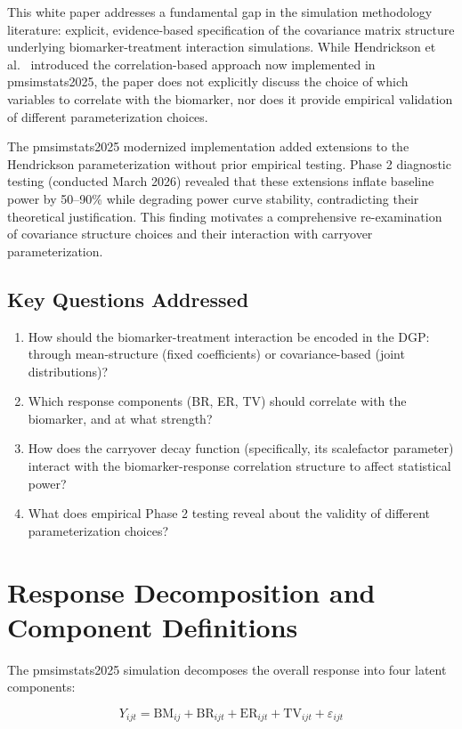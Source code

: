 \documentclass[12pt,a4paper]{article}
\begin{document}
This white paper addresses a fundamental gap in the simulation methodology literature: explicit, evidence-based specification of the covariance matrix structure underlying biomarker-treatment interaction simulations. While Hendrickson et al.~\cite{Hendrickson2020} introduced the correlation-based approach now implemented in pmsimstats2025, the paper does not explicitly discuss the choice of which variables to correlate with the biomarker, nor does it provide empirical validation of different parameterization choices.

The pmsimstats2025 modernized implementation added extensions to the Hendrickson parameterization without prior empirical testing. Phase 2 diagnostic testing (conducted March 2026) revealed that these extensions inflate baseline power by 50--90\% while degrading power curve stability, contradicting their theoretical justification. This finding motivates a comprehensive re-examination of covariance structure choices and their interaction with carryover parameterization.

\subsection{Key Questions Addressed}

\begin{enumerate}
\item How should the biomarker-treatment interaction be encoded in the DGP: through mean-structure (fixed coefficients) or covariance-based (joint distributions)?
\item Which response components (BR, ER, TV) should correlate with the biomarker, and at what strength?
\item How does the carryover decay function (specifically, its scalefactor parameter) interact with the biomarker-response correlation structure to affect statistical power?
\item What does empirical Phase 2 testing reveal about the validity of different parameterization choices?
\end{enumerate}

\section{Response Decomposition and Component Definitions}

The pmsimstats2025 simulation decomposes the overall response into four latent components:

\begin{equation}
Y_{ijt} = \text{BM}_{ij} + \text{BR}_{ijt} + \text{ER}_{ijt} + \text{TV}_{ijt} + \varepsilon_{ijt}
\end{equation}
\end{document}
